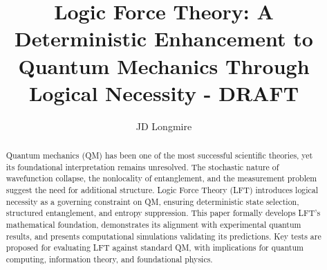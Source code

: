 \documentclass[sigconf]{acmart}
\title{Logic Force Theory: A Deterministic Enhancement to Quantum Mechanics Through Logical Necessity - DRAFT}
\author{JD Longmire}
\affiliation{%
  \institution{LFT, LLC.}
  \city{Hunstville}
  \state{AL}
  \country{USA}
  \email{longmire.jd@gmail.com}
}
\begin{document}
\begin{abstract}
Quantum mechanics (QM) has been one of the most successful scientific theories, yet its foundational interpretation remains unresolved. The stochastic nature of wavefunction collapse, the nonlocality of entanglement, and the measurement problem suggest the need for additional structure. Logic Force Theory (LFT) introduces logical necessity as a governing constraint on QM, ensuring deterministic state selection, structured entanglement, and entropy suppression. This paper formally develops LFT’s mathematical foundation, demonstrates its alignment with experimental quantum results, and presents computational simulations validating its predictions. Key tests are proposed for evaluating LFT against standard QM, with implications for quantum computing, information theory, and foundational physics.
\end{abstract}

\maketitle



















\end{document}
